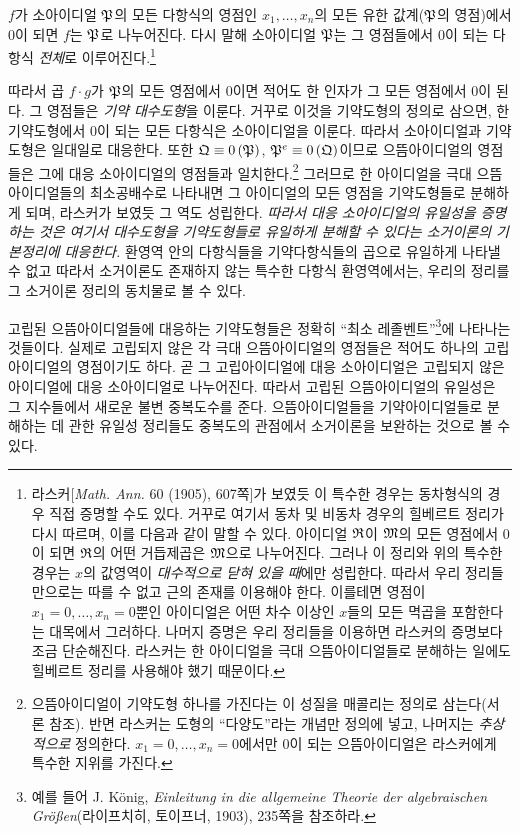 $f$가 소아이디얼 $\mathfrak{P}$의 모든 다항식의 영점인 $x_1,\ldots,x_n$의 모든 유한 값계($\mathfrak{P}$의 영점)에서 0이 되면 $f$는 $\mathfrak{P}$로 나누어진다. 다시 말해 소아이디얼 $\mathfrak{P}$는 그 영점들에서 0이 되는 다항식 \emph{전체}로 이루어진다.\footnote{라스커[\emph{Math. Ann.} 60 (1905), 607쪽]가 보였듯 이 특수한 경우는 동차형식의 경우 직접 증명할 수도 있다. 거꾸로 여기서 동차 및 비동차 경우의 힐베르트 정리가 다시 따르며, 이를 다음과 같이 말할 수 있다. 아이디얼 $\mathfrak{R}$이 $\mathfrak{M}$의 모든 영점에서 0이 되면 $\mathfrak{R}$의 어떤 거듭제곱은 $\mathfrak{M}$으로 나누어진다. 그러나 이 정리와 위의 특수한 경우는 $x$의 값영역이 \emph{대수적으로 닫혀 있을 때}에만 성립한다. 따라서 우리 정리들만으로는 따를 수 없고 근의 존재를 이용해야 한다. 이를테면 영점이 $x_1=0,\ldots,x_n=0$뿐인 아이디얼은 어떤 차수 이상인 $x$들의 모든 멱곱을 포함한다는 대목에서 그러하다. 나머지 증명은 우리 정리들을 이용하면 라스커의 증명보다 조금 단순해진다. 라스커는 한 아이디얼을 극대 으뜸아이디얼들로 분해하는 일에도 힐베르트 정리를 사용해야 했기 때문이다.}

따라서 곱 $f\cdot g$가 $\mathfrak{P}$의 모든 영점에서 0이면 적어도 한 인자가 그 모든 영점에서 0이 된다. 그 영점들은 \emph{기약 대수도형}을 이룬다. 거꾸로 이것을 기약도형의 정의로 삼으면, 한 기약도형에서 0이 되는 모든 다항식은 소아이디얼을 이룬다. 따라서 소아이디얼과 기약도형은 일대일로 대응한다. 또한 $\mathfrak{Q}\equiv 0\,(\mathfrak{P})$, $\mathfrak{P}^e\equiv 0\,(\mathfrak{Q})$이므로 으뜸아이디얼의 영점들은 그에 대응 소아이디얼의 영점들과 일치한다.\footnote{으뜸아이디얼이 기약도형 하나를 가진다는 이 성질을 매콜리는 정의로 삼는다(서론 참조). 반면 라스커는 도형의 ``다양도''라는 개념만 정의에 넣고, 나머지는 \emph{추상적으로} 정의한다. $x_1=0,\ldots,x_n=0$에서만 0이 되는 으뜸아이디얼은 라스커에게 특수한 지위를 가진다.} 그러므로 한 아이디얼을 극대 으뜸아이디얼들의 최소공배수로 나타내면 그 아이디얼의 모든 영점을 기약도형들로 분해하게 되며, 라스커가 보였듯 그 역도 성립한다. \emph{따라서 대응 소아이디얼의 유일성을 증명하는 것은 여기서 대수도형을 기약도형들로 유일하게 분해할 수 있다는 소거이론의 기본정리에 대응한다.} 환영역 안의 다항식들을 기약다항식들의 곱으로 유일하게 나타낼 수 없고 따라서 소거이론도 존재하지 않는 특수한 다항식 환영역에서는, 우리의 정리를 그 소거이론 정리의 동치물로 볼 수 있다.

고립된 으뜸아이디얼들에 대응하는 기약도형들은 정확히 ``최소 레졸벤트''\footnote{예를 들어 J. König, \emph{Einleitung in die allgemeine Theorie der algebraischen Größen}(라이프치히, 토이프너, 1903), 235쪽을 참조하라.}에 나타나는 것들이다. 실제로 고립되지 않은 각 극대 으뜸아이디얼의 영점들은 적어도 하나의 고립아이디얼의 영점이기도 하다. 곧 그 고립아이디얼에 대응 소아이디얼은 고립되지 않은 아이디얼에 대응 소아이디얼로 나누어진다. 따라서 고립된 으뜸아이디얼의 유일성은 그 지수들에서 새로운 불변 중복도수를 준다. 으뜸아이디얼들을 기약아이디얼들로 분해하는 데 관한 유일성 정리들도 중복도의 관점에서 소거이론을 보완하는 것으로 볼 수 있다.

